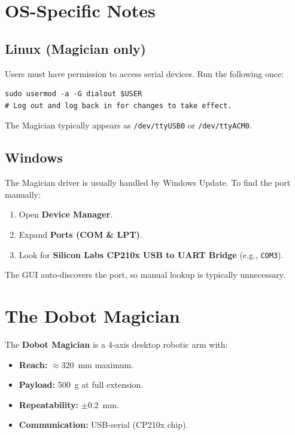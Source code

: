 \documentclass[11pt,a4paper]{article}
\begin{document}
\section{OS-Specific Notes}

\subsection{Linux (Magician only)}
Users must have permission to access serial devices. Run the following once:
\begin{lstlisting}[style=BashStyle]
sudo usermod -a -G dialout $USER
# Log out and log back in for changes to take effect.
\end{lstlisting}
The Magician typically appears as \texttt{/dev/ttyUSB0} or \texttt{/dev/ttyACM0}.

\subsection{Windows}
The Magician driver is usually handled by Windows Update. To find the port manually:
\begin{enumerate}
  \item Open \textbf{Device Manager}.
  \item Expand \textbf{Ports (COM \& LPT)}.
  \item Look for \textbf{Silicon Labs CP210x USB to UART Bridge} (e.g., \texttt{COM3}).
\end{enumerate}
The GUI auto-discovers the port, so manual lookup is typically unnecessary.

\section{The Dobot Magician}

The \textbf{Dobot Magician} is a 4-axis desktop robotic arm with:
\begin{itemize}
  \item \textbf{Reach:} $\approx$\qty{320}{\mm} maximum.
  \item \textbf{Payload:} \qty{500}{\g} at full extension.
  \item \textbf{Repeatability:} $\pm$\qty{0.2}{\mm}.
  \item \textbf{Communication:} USB-serial (CP210x chip).
\end{itemize}
\end{document}
